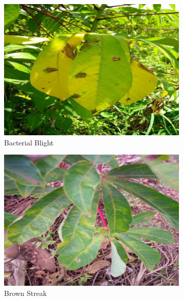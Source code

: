 \begin{figure}[htbp]
    \centering
    \begin{subfigure}{0.24\textwidth}
        \centering
        \includegraphics[width=\linewidth]{graphs/DiseaseImage/BacterialBlight.jpg}
        \caption{Bacterial Blight}
        \label{CassavaFigBac}
    \end{subfigure}
    \begin{subfigure}{0.24\textwidth}
        \centering
        \includegraphics[width=\linewidth]{graphs/DiseaseImage/BrownStreak.jpg}
        \caption{Brown Streak}
        \label{CassavaFigBro}
    \end{subfigure}
    \begin{subfigure}{0.24\textwidth}

\end{subfigure}
\end{figure}
